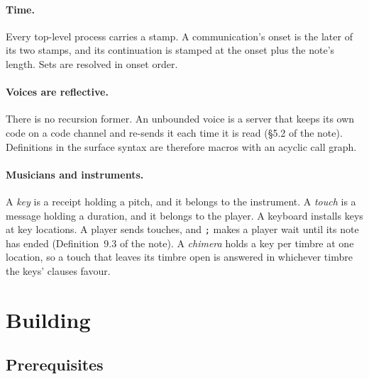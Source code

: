 \documentclass[11pt,a4paper]{article}
\newcommand{\ttx}[1]{\texttt{#1}}
\begin{document}
\paragraph{Time.} Every top-level process carries a stamp. A communication's
onset is the later of its two stamps, and its continuation is stamped at the
onset plus the note's length. Sets are resolved in onset order.

\paragraph{Voices are reflective.} There is no recursion former. An unbounded
voice is a server that keeps its own code on a code channel and re-sends it
each time it is read (\S5.2 of the note). Definitions in the surface syntax are
therefore macros with an acyclic call graph.

\paragraph{Musicians and instruments.} A \emph{key} is a receipt holding a
pitch, and it belongs to the instrument. A \emph{touch} is a message holding a
duration, and it belongs to the player. A keyboard installs keys at key
locations. A player sends touches, and \ttx{;} makes a player wait until its
note has ended (Definition~9.3 of the note). A \emph{chimera} holds a key per
timbre at one location, so a touch that leaves its timbre open is answered in
whichever timbre the keys' clauses favour.

\section{Building}\label{sec:build}

\subsection{Prerequisites}
\end{document}
